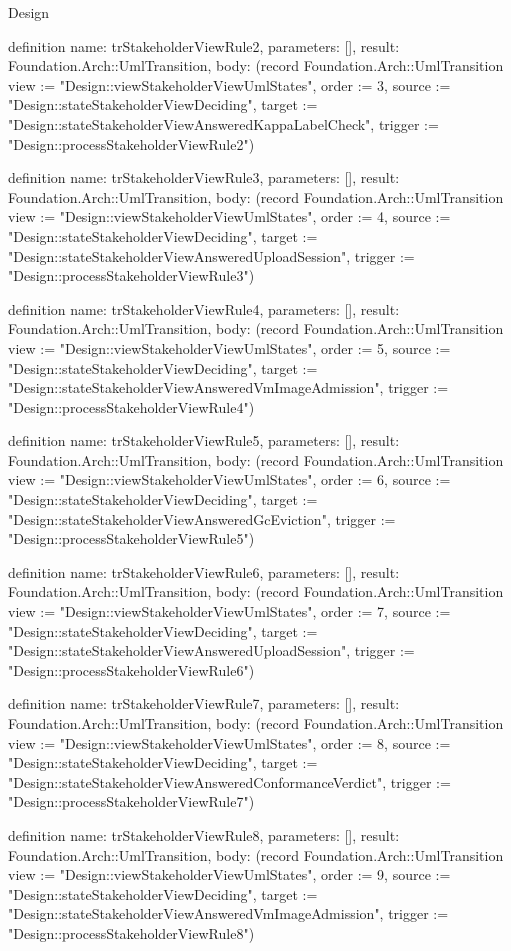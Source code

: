 \begin{lexlean}{Design}
\begin{semanticmodule}
definition{
  name: trStakeholderViewRule2,
  parameters: [],
  result: Foundation.Arch::UmlTransition,
  body: (record Foundation.Arch::UmlTransition {view := "Design::viewStakeholderViewUmlStates", order := 3, source := "Design::stateStakeholderViewDeciding", target := "Design::stateStakeholderViewAnsweredKappaLabelCheck", trigger := "Design::processStakeholderViewRule2"})
}

definition{
  name: trStakeholderViewRule3,
  parameters: [],
  result: Foundation.Arch::UmlTransition,
  body: (record Foundation.Arch::UmlTransition {view := "Design::viewStakeholderViewUmlStates", order := 4, source := "Design::stateStakeholderViewDeciding", target := "Design::stateStakeholderViewAnsweredUploadSession", trigger := "Design::processStakeholderViewRule3"})
}

definition{
  name: trStakeholderViewRule4,
  parameters: [],
  result: Foundation.Arch::UmlTransition,
  body: (record Foundation.Arch::UmlTransition {view := "Design::viewStakeholderViewUmlStates", order := 5, source := "Design::stateStakeholderViewDeciding", target := "Design::stateStakeholderViewAnsweredVmImageAdmission", trigger := "Design::processStakeholderViewRule4"})
}

definition{
  name: trStakeholderViewRule5,
  parameters: [],
  result: Foundation.Arch::UmlTransition,
  body: (record Foundation.Arch::UmlTransition {view := "Design::viewStakeholderViewUmlStates", order := 6, source := "Design::stateStakeholderViewDeciding", target := "Design::stateStakeholderViewAnsweredGcEviction", trigger := "Design::processStakeholderViewRule5"})
}

definition{
  name: trStakeholderViewRule6,
  parameters: [],
  result: Foundation.Arch::UmlTransition,
  body: (record Foundation.Arch::UmlTransition {view := "Design::viewStakeholderViewUmlStates", order := 7, source := "Design::stateStakeholderViewDeciding", target := "Design::stateStakeholderViewAnsweredUploadSession", trigger := "Design::processStakeholderViewRule6"})
}

definition{
  name: trStakeholderViewRule7,
  parameters: [],
  result: Foundation.Arch::UmlTransition,
  body: (record Foundation.Arch::UmlTransition {view := "Design::viewStakeholderViewUmlStates", order := 8, source := "Design::stateStakeholderViewDeciding", target := "Design::stateStakeholderViewAnsweredConformanceVerdict", trigger := "Design::processStakeholderViewRule7"})
}

definition{
  name: trStakeholderViewRule8,
  parameters: [],
  result: Foundation.Arch::UmlTransition,
  body: (record Foundation.Arch::UmlTransition {view := "Design::viewStakeholderViewUmlStates", order := 9, source := "Design::stateStakeholderViewDeciding", target := "Design::stateStakeholderViewAnsweredVmImageAdmission", trigger := "Design::processStakeholderViewRule8"})
}


\end{semanticmodule}
\end{lexlean}
